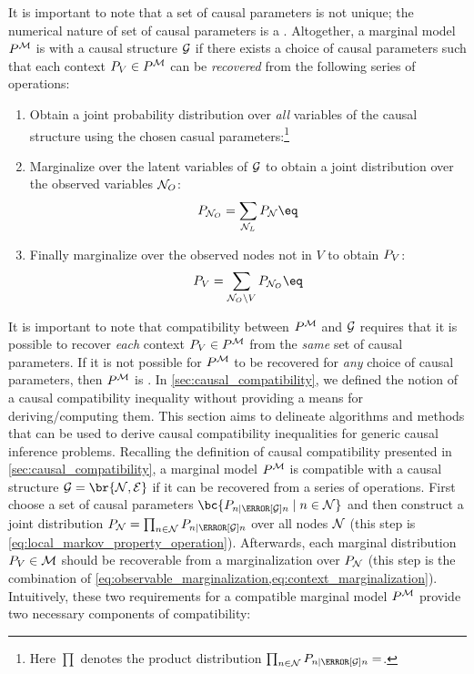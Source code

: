 \documentclass[aps, 10pt, english, twoside, pra, nofootinbib, tightenlines, longbibliography, superscriptaddress]{revtex4-1}
\begin{document}
    It is important to note that a set of causal parameters is not unique; the numerical nature of set of causal parameters is a . Altogether, a marginal model $\prob^{\mscenario}$ is  with a causal structure $\mathcal{G}$ if there exists a choice of causal parameters such that each context $\prob[V] \in \prob^{\mscenario}$ can be \textit{recovered} from the following series of operations:
    \begin{enumerate}
        \item Obtain a joint probability distribution over \textit{all} variables of the causal structure using the chosen casual parameters:\footnote{Here $\prod$ denotes the product distribution $\prod_{n \in \nodes} \prob[n \mid \Pa[\graph]{n}] = $.}
        \item Marginalize over the latent variables of $\mathcal{G}$ to obtain a joint distribution over the observed variables $\mathcal{N}_O$:
        \[ \prob[\nodes_O] = \sum_{\nodes_L} \prob[\nodes] \eq \label{eq:observable_marginalization} \]
        \item Finally marginalize over the observed nodes not in $V$ to obtain $\prob[V]$:
        \[ \prob[V] = \sum_{\nodes_O \setminus V} \prob[\nodes_O] \eq \label{eq:context_marginalization} \]
    \end{enumerate}
    It is important to note that compatibility between $\prob^{\mscenario}$ and $\mathcal{G}$ requires that it is possible to recover \textit{each} context $\prob[V] \in \prob^{\mscenario}$ from the \textit{same} set of causal parameters. If it is not possible for $\prob^{\mscenario}$ to be recovered for \textit{any} choice of causal parameters, then $\prob^{\mscenario}$ is .
    In \cref{sec:causal_compatibility}, we defined the notion of a causal compatibility inequality without providing a means for deriving/computing them. This section aims to delineate algorithms and methods that can be used to derive causal compatibility inequalities for generic causal inference problems. Recalling the definition of causal compatibility presented in \cref{sec:causal_compatibility}, a marginal model $\prob^{\mscenario}$ is compatible with a causal structure $\graph = \br{\nodes, \edges}$ if it can be recovered from a series of operations. First choose a set of causal parameters $\bc{\prob[n\mid\Pa[\graph]{n}] \mid n \in \nodes}$ and then construct a joint distribution $\prob[\nodes] = \prod_{n \in \nodes} \prob[n \mid \Pa[\graph]{n}]$ over all nodes $\mathcal{N}$ (this step is \cref{eq:local_markov_property_operation}). Afterwards, each marginal distribution $\prob[V] \in \mscenario$ should be recoverable from a marginalization over $\prob[\nodes]$ (this step is the combination of \cref{eq:observable_marginalization,eq:context_marginalization}). Intuitively, these two requirements for a compatible marginal model $\prob^{\mscenario}$ provide two necessary components of compatibility:
\end{document}

